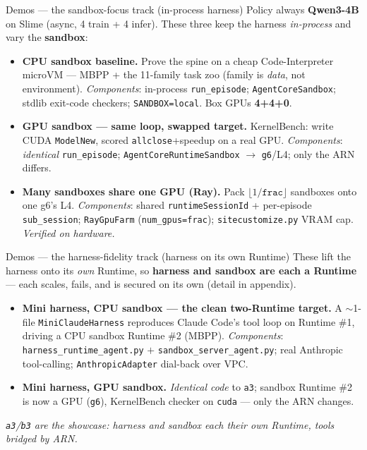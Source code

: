 \documentclass[aspectratio=169]{beamer}
\begin{document}
\begin{frame}{Demos --- the sandbox-focus track (in-process harness)}
  \footnotesize Policy always \textbf{Qwen3-4B} on Slime (async, 4 train + 4 infer). These three keep the
  harness \emph{in-process} and vary the \textbf{sandbox}:
  \begin{itemize}\setlength\itemsep{0.3em}
    \item[\texttt{a}] \textbf{CPU sandbox baseline.} Prove the spine on a cheap Code-Interpreter microVM ---
      MBPP + the 11-family task zoo (family is \emph{data}, not environment).
      \emph{Components}: in-process \texttt{run\_episode}; \texttt{AgentCoreSandbox}; stdlib exit-code
      checkers; \texttt{SANDBOX=local}. Box GPUs \textbf{4+4+0}.
    \item[\texttt{b}] \textbf{GPU sandbox --- same loop, swapped target.} KernelBench: write CUDA
      \texttt{ModelNew}, scored \texttt{allclose}+speedup on a real GPU.
      \emph{Components}: \emph{identical} \texttt{run\_episode}; \texttt{AgentCoreRuntimeSandbox} $\to$
      \texttt{g6}/L4; only the ARN differs.
    \item[\texttt{b4}] \textbf{Many sandboxes share one GPU (Ray).} Pack $\lfloor 1/\texttt{frac}\rfloor$
      sandboxes onto one g6's L4.
      \emph{Components}: shared \texttt{runtimeSessionId} + per-episode \texttt{sub\_session};
      \texttt{RayGpuFarm} (\texttt{num\_gpus=frac}); \texttt{sitecustomize.py} VRAM cap. \emph{Verified on hardware.}
  \end{itemize}
\end{frame}

\begin{frame}{Demos --- the harness-fidelity track (harness on its own Runtime)}
  \footnotesize These lift the harness onto its \emph{own} Runtime, so \textbf{harness and sandbox are
  each a Runtime} --- each scales, fails, and is secured on its own (detail in appendix).
  \begin{itemize}\setlength\itemsep{0.5em}
    \item[\texttt{a3}] \textbf{Mini harness, CPU sandbox --- the clean two-Runtime target.} A $\sim$1-file
      \texttt{MiniClaudeHarness} reproduces Claude Code's tool loop on Runtime \#1, driving a CPU sandbox
      Runtime \#2 (MBPP). \emph{Components}: \texttt{harness\_runtime\_agent.py} $+$
      \texttt{sandbox\_server\_agent.py}; real Anthropic tool-calling; \texttt{AnthropicAdapter} dial-back over VPC.
    \item[\texttt{b3}] \textbf{Mini harness, GPU sandbox.} \emph{Identical code} to \texttt{a3}; sandbox
      Runtime \#2 is now a GPU (\texttt{g6}), KernelBench checker on \texttt{cuda} --- only the ARN changes.
  \end{itemize}
  \vspace{0.5em}
  {\footnotesize\itshape \texttt{a3}/\texttt{b3} are the showcase: harness \emph{and} sandbox each their own
  Runtime, tools bridged by ARN.}
\end{frame}
\end{document}
